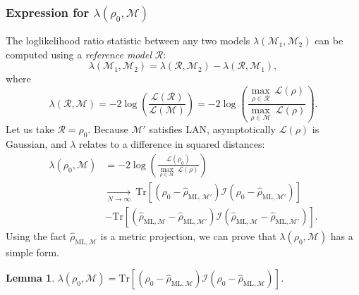 \documentclass[aps,pra, twocolumn]{revtex4-1}
\newcommand{\M}{\mathcal{M}}
\newcommand{\cL}{\mathcal{L}}
\newcommand{\rhohat}{\hat{\rho}}
\newcommand{\rhoML}[1]{\rhohat_{\scriptscriptstyle{\mathrm{ML},#1}}}
\newtheorem{lem}{Lemma}
\begin{document}
\subsubsection{Expression for $\lambda(\rho_{0}, \M)$}

The loglikelihood ratio statistic between any two models $\lambda(\M_{1}, \M_{2})$ can be computed using a \emph{reference model} $\mathcal{R}$: 
\[\lambda(\M_{1}, \M_{2}) = \lambda(\mathcal{R},\M_{2}) - \lambda(\mathcal{R},\M_{1}),\]
where
\[\lambda(\mathcal{R}, \M) = -2 \log \left(\frac{\cL(\mathcal{R})}{\cL(\M)}\right) =  -2 \log \left(\frac{\underset{\rho \in \mathcal{R}}{\max}~\cL(\rho)}{\underset{\rho \in \M}{\max}~\cL(\rho)}\right).\]
Let us take $\mathcal{R} = \rho_{0}$. Because $\M'$ satisfies LAN, asymptotically $\mathcal{L}(\rho)$ is Gaussian, and $\lambda$ relates to a difference in squared distances:
\begin{align}
\label{eq:lambdalan}
\nonumber \lambda(\rho_{0}, \M)&= -2 \log \left(\frac{\cL(\rho_{0})}{\underset{\rho \in \M}{\max}~\cL(\rho)}\right)\\
\nonumber &\xrightarrow[N \rightarrow \infty]{}~\mathrm{Tr}[(\rho_{0} - \rhoML{\M'})\mathcal{I}(\rho_{0} - \rhoML{\M'})]\\
&-  \mathrm{Tr}[(\rhoML{\M} - \rhoML{\M'})\mathcal{I}(\rhoML{\M} - \rhoML{\M'})].
\end{align}
Using the fact $\rhoML{\M}$ is a metric projection, we can prove that $\lambda(\rho_{0}, \M)$ has a simple form.

\begin{lem}
$\lambda(\rho_{0}, \M) = \mathrm{Tr}[(\rho_{0} - \rhoML{\M})\mathcal{I}(\rho_{0} - \rhoML{\M})]$.
\end{lem}
\end{document}
